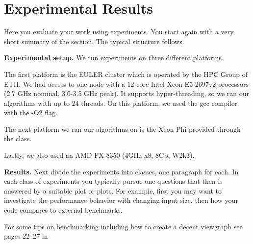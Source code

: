 \documentclass[letterpaper]{article}
\newcommand{\mypar}[1]{{\bf #1.}} %
\begin{document}
	
	
	
	
	
	\section{Experimental Results}\label{sec:exp}
	
	Here you evaluate your work using experiments. You start again with a
	very short summary of the section. The typical structure follows.
	
	\mypar{Experimental setup}
	We run experiments on three different platforms.
	
	The first platform is the EULER cluster which is operated by the HPC Group of ETH. We had access to one node with a 12-core Intel Xeon E5-2697v2 processors (2.7 GHz nominal, 3.0-3.5 GHz peak). It supports hyper-threading, so we ran our algorithms with up to 24 threads. On this platform, we used the gcc compiler with the -O2 flag.
	
	The next platform we ran our algorithms on is the Xeon Phi provided through the class.
	
	Lastly, we also used an AMD FX-8350 (4GHz x8, 8Gb, W2k3).
	
	\mypar{Results}
	Next divide the experiments into classes, one paragraph for each. In each class of experiments you typically pursue one questions that then is answered by a suitable plot or plots. For example, first you may want to investigate the performance behavior with changing input size, then how your code compares to external benchmarks.
	
	For some tips on benchmarking including how to create a decent viewgraph see pages 22--27 in
	
\end{document}
